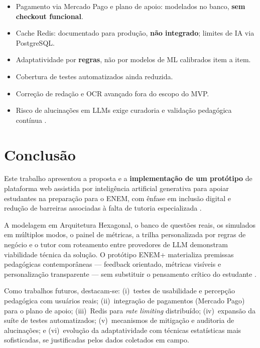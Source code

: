 \documentclass[12pt]{article}
\begin{document}
\begin{itemize}
    \item Pagamento via Mercado Pago e plano de apoio: modelados no banco, \textbf{sem checkout funcional}.
    \item Cache Redis: documentado para produção, \textbf{não integrado}; limites de IA via PostgreSQL.
    \item Adaptatividade por \textbf{regras}, não por modelos de ML calibrados item a item.
    \item Cobertura de testes automatizados ainda reduzida.
    \item Correção de redação e OCR avançado fora do escopo do MVP.
    \item Risco de alucinações em LLMs exige curadoria e validação pedagógica contínua \cite{sebastiani2023,kasneci2023}.
\end{itemize}

\section{Conclusão}
\label{sec:conclusao}

Este trabalho apresentou a proposta e a \textbf{implementação de um protótipo} de plataforma web assistida por inteligência artificial generativa para apoiar estudantes na preparação para o ENEM, com ênfase em inclusão digital e redução de barreiras associadas à falta de tutoria especializada \cite{latitude2023}.

A modelagem em Arquitetura Hexagonal, o banco de questões reais, os simulados em múltiplos modos, o painel de métricas, a trilha personalizada por regras de negócio e o tutor com roteamento entre provedores de LLM demonstram viabilidade técnica da solução. O protótipo ENEM+ materializa premissas pedagógicas contemporâneas --- feedback orientado, métricas visíveis e personalização transparente --- sem substituir o pensamento crítico do estudante \cite{bezerra2023}.

Como trabalhos futuros, destacam-se: (i)~testes de usabilidade e percepção pedagógica com usuários reais; (ii)~integração de pagamentos (Mercado Pago) para o plano de apoio; (iii)~Redis para \textit{rate limiting} distribuído; (iv)~expansão da suíte de testes automatizados; (v)~mecanismos de mitigação e auditoria de alucinações; e (vi)~evolução da adaptatividade com técnicas estatísticas mais sofisticadas, se justificadas pelos dados coletados em campo.



\end{document}
